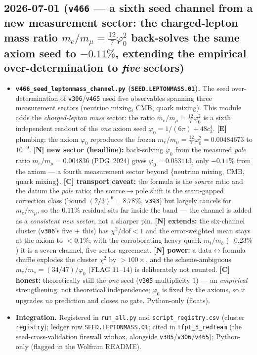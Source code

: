 \subsection*{2026-07-01 (\texttt{v466} --- a sixth seed channel from a new measurement sector: the charged-lepton mass ratio $m_e/m_\mu{=}\tfrac{12}{7}\varphi_0^2$ back-solves the same axiom seed to $-0.11\%$, extending the empirical over-determination to \emph{five} sectors)}
\begin{itemize}
\item \textbf{\texttt{v466\_seed\_leptonmass\_channel.py} (\texttt{SEED.LEPTONMASS.01}).} The seed
over-determination of \texttt{v306}/\texttt{v465} used five observables spanning three measurement
sectors (neutrino mixing, CMB, quark mixing). This module adds the \emph{charged-lepton mass} sector:
the ratio $m_e/m_\mu{=}\tfrac{12}{7}\varphi_0^2$ is a sixth independent readout of the \emph{one} axiom
seed $\varphi_0{=}1/(6\pi){+}48c_3^4$. \textbf{[E]} plumbing: the axiom $\varphi_0$ reproduces the frozen
$m_e/m_\mu{=}\tfrac{12}{7}\varphi_0^2{=}0.00484673$ to $10^{-9}$. \textbf{[N] new sector (headline):}
back-solving $\varphi_0$ from the measured \emph{pole} ratio $m_e/m_\mu{=}0.004836$ (PDG~2024) gives
$\varphi_0{=}0.053113$, only $-0.11\%$ from the axiom --- a fourth measurement sector beyond
\{neutrino mixing, CMB, quark mixing\}. \textbf{[C] transport caveat:} the formula is the \emph{source}
ratio and the datum the \emph{pole} ratio; the source$\to$pole shift is the seam-gapped correction class
(bound $(2/3)^6{=}8.78\%$, \texttt{v393}) but largely cancels for $m_e/m_\mu$, so the $0.11\%$ residual sits
far inside the band --- the channel is added as a \emph{consistent new sector}, not a sharper pin.
\textbf{[N] extends:} the six-channel cluster (\texttt{v306}'s five $+$ this) has $\chi^2/\mathrm{dof}{<}1$
and the error-weighted mean stays at the axiom to ${<}0.1\%$; with the corroborating heavy-quark
$m_t/m_b$ ($-0.23\%$) it is a seven-channel, five-sector agreement. \textbf{[N] power:} a
data$\leftrightarrow$formula shuffle explodes the cluster $\chi^2$ by ${>}100\times$, and the
scheme-ambiguous $m_c/m_s{=}(34/47)/\varphi_0$ (FLAG $11$--$14$) is deliberately not counted.
\textbf{[C] honest:} theoretically still the \emph{one} seed (\texttt{v305} multiplicity $1$) --- an
\emph{empirical} strengthening, not theoretical independence; $\varphi_0$ is fixed by the axioms, so it
upgrades \emph{no} prediction and closes \emph{no} gate. Python-only (floats).
\item \textbf{Integration.} Registered in \texttt{run\_all.py} and \texttt{script\_registry.csv}
(cluster \texttt{registry}); ledger row \texttt{SEED.LEPTONMASS.01}; cited in \texttt{tfpt\_5\_redteam}
(the seed-cross-validation firewall winbox, alongside \texttt{v305}/\texttt{v306}/\texttt{v465});
Python-only (flagged in the Wolfram README).
\end{itemize}

